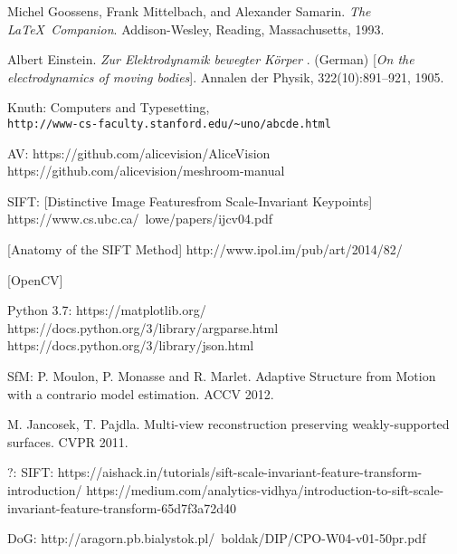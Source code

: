 
\begin{thebibliography}{9}
Michel Goossens, Frank Mittelbach, and Alexander Samarin.
\textit{The \LaTeX\ Companion}.
Addison-Wesley, Reading, Massachusetts, 1993.

Albert Einstein.
\textit{Zur Elektrodynamik bewegter K{\"o}rper} . (German)
[\textit{On the electrodynamics of moving bodies}].
Annalen der Physik, 322(10):891–921, 1905.

Knuth: Computers and Typesetting,
\\\texttt{http://www-cs-faculty.stanford.edu/\~{}uno/abcde.html}
\end{thebibliography}

AV:
https://github.com/alicevision/AliceVision
https://github.com/alicevision/meshroom-manual

SIFT:
[Distinctive Image Featuresfrom Scale-Invariant Keypoints]
https://www.cs.ubc.ca/~lowe/papers/ijcv04.pdf

[Anatomy of the SIFT Method]
http://www.ipol.im/pub/art/2014/82/

[OpenCV]

Python 3.7:
https://matplotlib.org/
https://docs.python.org/3/library/argparse.html
https://docs.python.org/3/library/json.html

SfM:
P. Moulon, P. Monasse and R. Marlet. Adaptive Structure from Motion with a contrario model estimation. ACCV 2012.

M. Jancosek, T. Pajdla. Multi-view reconstruction preserving weakly-supported surfaces. CVPR 2011.



?:
SIFT:
https://aishack.in/tutorials/sift-scale-invariant-feature-transform-introduction/
https://medium.com/analytics-vidhya/introduction-to-sift-scale-invariant-feature-transform-65d7f3a72d40

DoG:
http://aragorn.pb.bialystok.pl/~boldak/DIP/CPO-W04-v01-50pr.pdf
